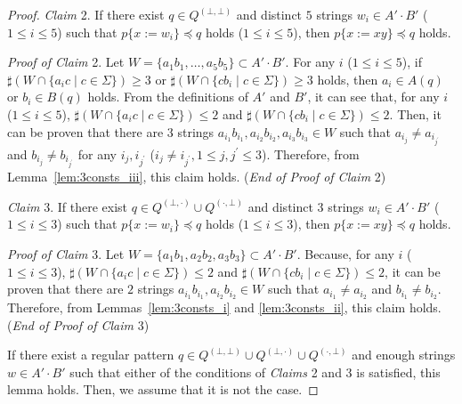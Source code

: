 \begin{proof}
\noindent
\textit{Claim} 2. If there exist $q \in Q^{(\bot,\bot)}$ and distinct $5$ strings $w_{i} \in A'\cdot B'$ ($1\leq i\leq 5$) such  that $p \{ x:=w_{i} \} \preceq q$ holds ($1\leq i\leq 5$),  then $p \{ x:=xy \} \preceq q$ holds.

\smallskip

\noindent
\textit{Proof of Claim} 2.
Let $W = \{a_{1}b_{1},\ldots,a_{5}b_{5}\} \subset A'\cdot B'$.
{\color{red}For any $i$ ($1\leq i\leq 5$), if $\sharp (W\cap \{a_{i}c \mid c \in \Sigma\})\geq 3$ or $\sharp (W \cap \{cb_{i} \mid c \in \Sigma\}) \geq 3$ holds, then $a_{i}\in A(q)$ or $b_{i}\in B(q)$ holds.
From the definitions of $A'$ and $B'$, it can see that,  
for any $i$ ($1\leq i\leq 5$), $\sharp (W \cap \{a_{i}c \mid c \in \Sigma\}) \leq 2$ and $\sharp (W \cap \{cb_{i} \mid c \in \Sigma\}) \leq 2$.}
{\color{red} Then,} it can be proven that there are $3$ strings $a_{i_{1}}b_{i_{1}},a_{i_{2}}b_{i_{2}},a_{i_{3}}b_{i_{3}}\in W$ such that $a_{i_{j}} \not= a_{i_{j^{\prime}}}$ and $b_{i_{j}} \not= b_{i_{j^{\prime}}}$ for any $i_{j},i_{j^{\prime}}$ ($i_{j}\not= i_{j^{\prime}}, 1\leq j,j^{\prime}\leq 3$).
Therefore, from Lemma~\ref{lem:3consts_iii}, this claim holds. (\textit{End of Proof of Claim} 2)

\smallskip

\noindent
\textit{Claim} 3. If there exist $q \in Q^{(\bot,\cdot)} \cup Q^{(\cdot,\bot)}$ and distinct $3$ strings $w_{i} \in A'\cdot B'$ ($1\leq i\leq 3$) such that $p \{ x:=w_{i} \} \preceq q$ holds ($1\leq i\leq 3$),  then $p \{ x:=xy \} \preceq q$ holds.

\noindent
\textit{Proof of Claim} 3.
Let $W = \{a_{1}b_{1},a_{2}b_{2},a_{3}b_{3}\} \subset A'\cdot B'$.
Because, for any $i$ ($1\leq i\leq 3$), $\sharp(W \cap \{a_{i}c \mid c \in \Sigma\}) \leq 2$ and  $\sharp (W \cap \{cb_{i} \mid c \in \Sigma\}) \leq 2$, it can be proven that there are $2$ strings $a_{i_{1}}b_{i_{1}},a_{i_{2}}b_{i_{2}}\in W$ such that $a_{i_{1}} \not= a_{i_{2}}$ and $b_{i_{1}} \not= b_{i_{2}}$.
Therefore, from Lemmas~\ref{lem:3consts_i} and \ref{lem:3consts_ii}, this claim holds. (\textit{End of Proof of Claim} 3)

\smallskip

\noindent
If there exist a regular pattern $q \in Q^{(\bot,\bot)} \cup Q^{(\bot,\cdot)} \cup Q^{(\cdot,\bot)}$ and enough strings $w \in A'\cdot B'$ such that either of the conditions of \textit{Claims} 2 and 3 is satisfied, this lemma holds. Then, we assume that it is not the case.


\end{proof}
